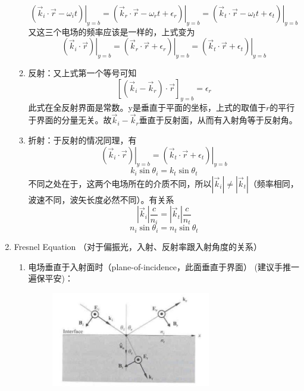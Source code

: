 \documentclass{ctexart}
\begin{document}
\begin{enumerate}
\begin{enumerate}
\begin{equation}
\left.\left(\vec{k}_{i} \cdot \vec{r}-\omega_{i} t\right)\right|_{y=b}=\left.\left(\vec{k}_{r} \cdot \vec{r}-\omega_{r} t+\epsilon_{r}\right)\right|_{y=b}=\left.\left(\vec{k}_{t} \cdot \vec{r}-\omega_{t} t+\epsilon_{t}\right)\right|_{y=b}
\end{equation}
又这三个电场的频率应该是一样的，上式变为
\begin{equation}
\left.\left(\vec{k}_{i} \cdot \vec{r}\right)\right|_{y=b}=\left.\left(\vec{k}_{r} \cdot \vec{r}+\epsilon_{r}\right)\right|_{y=b}=\left.\left(\vec{k}_{t} \cdot \vec{r}+\epsilon_{t}\right)\right|_{y=b}
\end{equation}
\item 反射：又上式第一个等号可知
\begin{equation}
\left[\left(\vec{k}_{i}-\vec{k}_{r}\right) \cdot \vec{r}\right]_{y=b}=\epsilon_{r}
\end{equation}
此式在全反射界面是常数。y是垂直于平面的坐标，上式的取值于$r$的平行于界面的分量无关。故$\vec{k}_{i}-\vec{k}_{r}$垂直于反射面，从而有入射角等于反射角。
\item 折射：于反射的情况同理，有
\begin{equation}
\left.\left(\vec{k}_{i} \cdot \vec{r}\right)\right|_{y=b}=\left.\left(\vec{k}_{t} \cdot \vec{r}+\epsilon_{t}\right)\right|_{y=b}
\end{equation}
\begin{equation}
k_{i} \sin \theta_{i}=k_{t} \sin \theta_{t}
\end{equation}
不同之处在于，这两个电场所在的介质不同，所以$|\vec{k}_{i}|\neq |\vec{k}_{t}|$（频率相同，波速不同，波矢长度必然不同）。有关系
\begin{equation}
|\vec{k}_{i}|\frac{c}{n_i}=|\vec{k}_{t}|\frac{c}{n_t}
\end{equation}
\begin{equation}
n_{i} \sin \theta_{i}=n_{t} \sin \theta_{t}
\end{equation}
\end{enumerate}
\item Fresnel Equation （对于偏振光，入射、反射率跟入射角度的关系）
\begin{enumerate}
\item 电场垂直于入射面时（plane-of-incidence，此面垂直于界面） (建议手推一遍保平安)：\\
\begin{figure}
\center
\includegraphics[width=0.7\textwidth]{Fresnel平行.png}

\end{figure}
\end{enumerate}
\end{enumerate}
\end{document}
